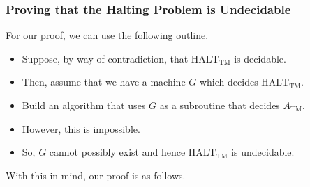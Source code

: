 \documentclass[letterpaper]{article}
\begin{document}
\subsubsection{Proving that the Halting Problem is Undecidable}
For our proof, we can use the following outline. 
\begin{itemize}
    \item Suppose, by way of contradiction, that $\text{HALT}_{\text{TM}}$ is decidable. 
    \item Then, assume that we have a machine $G$ which decides $\text{HALT}_{\text{TM}}$. 
    \item Build an algorithm that uses $G$ as a subroutine that decides $A_{\text{TM}}$. 
    \item However, this is impossible. 
    \item So, $G$ cannot possibly exist and hence $\text{HALT}_{\text{TM}}$ is undecidable.
\end{itemize}
With this in mind, our proof is as follows. 
\end{document}
